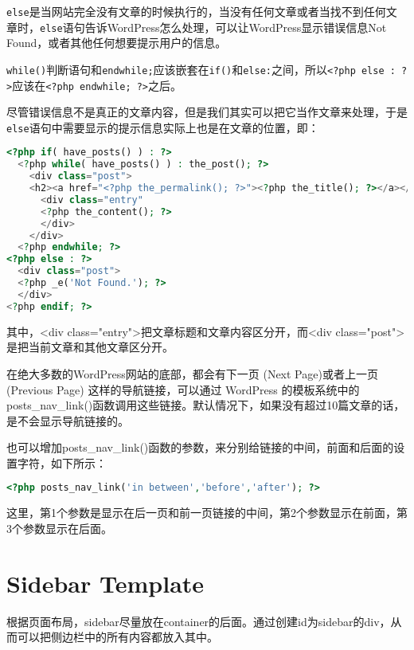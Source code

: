 \texttt{else}是当网站完全没有文章的时候执行的，当没有任何文章或者当找不到任何文章时，\texttt{else}语句告诉WordPress怎么处理，可以让WordPress显示错误信息Not Found，或者其他任何想要提示用户的信息。

\texttt{while()}判断语句和\texttt{endwhile;}应该嵌套在\texttt{if()}和\texttt{else:}之间，所以\texttt{<?php else : ?>}应该在\texttt{<?php endwhile; ?>}之后。

尽管错误信息不是真正的文章内容，但是我们其实可以把它当作文章来处理，于是\texttt{else}语句中需要显示的提示信息实际上也是在文章的位置，即：


\begin{lstlisting}[language=PHP]
<?php if( have_posts() ) : ?>
  <?php while( have_posts() ) : the_post(); ?>
    <div class="post">
    <h2><a href="<?php the_permalink(); ?>"><?php the_title(); ?></a></h2>
      <div class="entry"
      <?php the_content(); ?>
      </div>
    </div>
  <?php endwhile; ?>
<?php else : ?>
  <div class="post">
  <?php _e('Not Found.'); ?>
  </div>
<?php endif; ?>    
\end{lstlisting}

其中，<div class="entry">把文章标题和文章内容区分开，而<div class="post">是把当前文章和其他文章区分开。

在绝大多数的WordPress网站的底部，都会有下一页 (Next Page)或者上一页 (Previous Page) 这样的导航链接，可以通过 WordPress 的模板系统中的 posts\_nav\_link()函数调用这些链接。默认情况下，如果没有超过10篇文章的话，是不会显示导航链接的。

也可以增加posts\_nav\_link()函数的参数，来分别给链接的中间，前面和后面的设置字符，如下所示：

\begin{lstlisting}[language=PHP]
<?php posts_nav_link('in between','before','after'); ?>
\end{lstlisting}

这里，第1个参数是显示在后一页和前一页链接的中间，第2个参数显示在前面，第3个参数显示在后面。







\section{Sidebar Template}





根据页面布局，sidebar尽量放在container的后面。通过创建id为sidebar的div，从而可以把侧边栏中的所有内容都放入其中。

